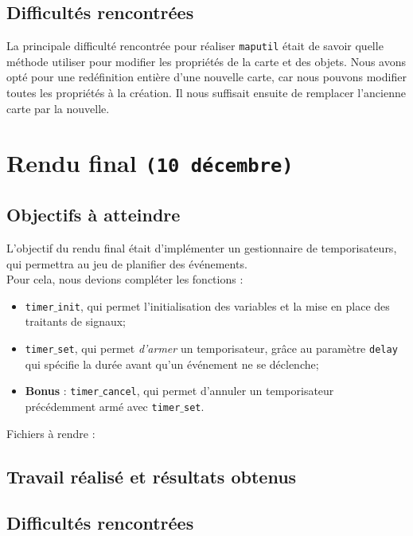 \documentclass[a4paper, 12pt]{article}
\begin{document}
	
	\subsection{Difficultés rencontrées}
		
La principale difficulté rencontrée pour réaliser \texttt{maputil} était de savoir quelle méthode utiliser pour modifier les propriétés de la carte et des objets. Nous avons opté pour une redéfinition entière d'une nouvelle carte, car nous pouvons modifier toutes les propriétés à la création. Il nous suffisait ensuite de remplacer l'ancienne carte par la nouvelle. 
	
\newpage
\section{Rendu final \texttt{(10 décembre)}}
	\subsection{Objectifs à atteindre}
	L'objectif du rendu final était d'implémenter un gestionnaire de temporisateurs, qui permettra au jeu de planifier des événements. \\
	Pour cela, nous devions compléter les fonctions :
\begin{itemize}
	 \item \texttt{timer$\_$init}, qui permet l'initialisation des variables et la mise en place des traitants de signaux;
	 \item \texttt{timer$\_$set}, qui permet \textit{d'armer} un temporisateur, grâce au paramètre \texttt{delay} qui spécifie la durée avant qu'un événement ne se déclenche; \\
	 \item \textbf{Bonus} : \texttt{timer$\_$cancel}, qui permet d'annuler un temporisateur précédemment armé avec \texttt{timer$\_$set}. \\
\end{itemize}

	Fichiers à rendre :
	
	

	\subsection{Travail réalisé et résultats obtenus}
	
	
	
	\subsection{Difficultés rencontrées}
\end{document}
